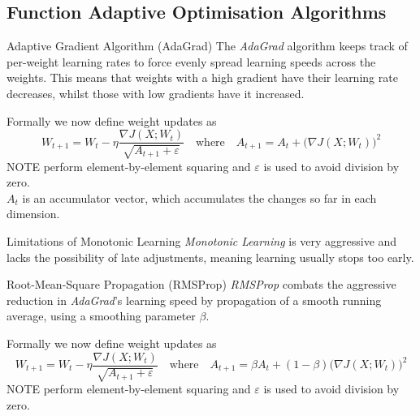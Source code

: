 \documentclass[11pt,a4paper]{article}
\begin{document}
\subsection{Function Adaptive Optimisation Algorithms}

  \begin{definition}{Adaptive Gradient Algorithm (AdaGrad)}
    The \textit{AdaGrad} algorithm keeps track of per-weight learning rates to force evenly spread learning speeds across the weights. This means that weights with a high gradient have their learning rate decreases, whilst those with low gradients have it increased.
    \par Formally we now define weight updates as
    \[
      W_{t+1}=W_t-\eta\dfrac{\nabla J(X;W_t)}{\sqrt{A_{t+1}+\varepsilon}}\quad\text{where}\quad A_{t+1}=A_t+\big(\nabla J(X;W_t)\big)^2
    \]
    NOTE perform element-by-element squaring and $\varepsilon$ is used to avoid division by zero.\\
    $A_t$ is an accumulator vector, which accumulates the changes so far in each dimension.
  \end{definition}

  \begin{remark}{Limitations of Monotonic Learning}
    \textit{Monotonic Learning} is very aggressive and lacks the possibility of late adjustments, meaning learning usually stops too early.
  \end{remark}

  \begin{proposition}{Root-Mean-Square Propagation (RMSProp)}
    \textit{RMSProp} combats the aggressive reduction in \textit{AdaGrad}'s learning speed by propagation of a smooth running average, using a smoothing parameter $\beta$.
    \par Formally we now define weight updates as
    \[
      W_{t+1}=W_t-\eta\dfrac{\nabla J(X;W_t)}{\sqrt{A_{t+1}+\varepsilon}}\quad\text{where}\quad A_{t+1}=\beta A_t+(1-\beta)\big(\nabla J(X;W_t)\big)^2
    \]
    NOTE perform element-by-element squaring and $\varepsilon$ is used to avoid division by zero.\\
  \end{proposition}
\end{document}
